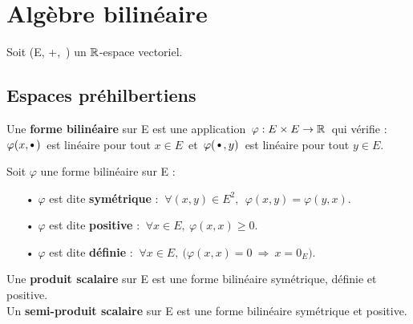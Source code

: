 
\section{Algèbre bilinéaire}


\vspace{0.4cm}

\begin{center}
    Soit (E, +,\ \x) un \(\mathbb{R}\)-espace vectoriel.
\end{center}

\vspace{0.2cm}
\subsection{Espaces préhilbertiens}

\vspace{0.8cm}

Une \textbf{forme bilinéaire} sur E est une application \(\,\varphi :E\times E\to \mathbb{R}\,\) qui vérifie : \vspace{0.1cm}\\
\(\varphi(x,\sbullet[0.75]\,)\,\) est linéaire pour tout \(x\in E\,\) et \(\,\varphi(\,\sbullet[0.75]\,,y)\,\) est linéaire pour tout \(y\in E.\)

\vspace{1cm}

\noindent Soit \(\varphi\) une forme bilinéaire sur E :\vspace{0.1cm}
\begin{itemize}[leftmargin=1.5cm]\vspace{-0.1cm}
    \item[•] \(\varphi\) est dite \textbf{symétrique} \ssi : \(\ \forall (x,y)\in E^2,\ \ \varphi(x,y)=\varphi(y,x). \)\vspace{0.1cm}

    \item[•] \(\varphi\) est dite \textbf{positive} \ssi : \(\ \forall x\in E,\ \varphi(x,x)\geq 0. \)\vspace{0.1cm}

    \item[•] \(\varphi\) est dite \textbf{définie} \ssi : \(\ \forall x\in E,\ \bigl(\varphi(x,x)=0 \ \Rightarrow \ x=0_E\bigr). \)
\end{itemize}

\vspace{1cm}

\noindent Une \textbf{produit scalaire} sur E est une forme bilinéaire symétrique, définie et positive.\\
Un \textbf{semi-produit scalaire} sur E est une forme bilinéaire symétrique et positive.

